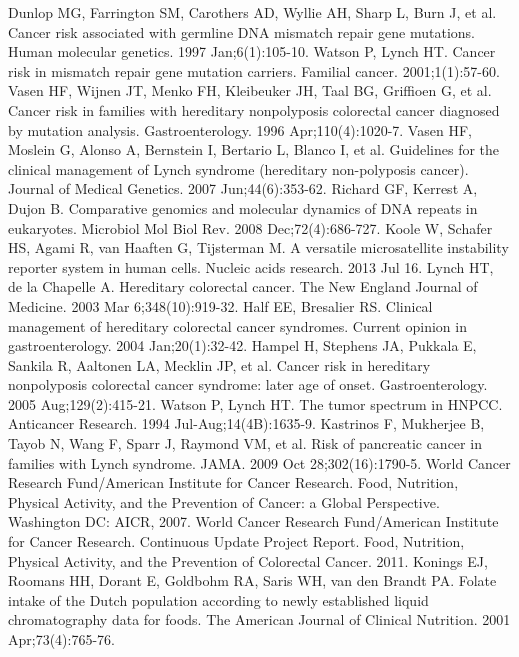 \begin{thebibliography}{12}
		Dunlop MG, Farrington SM, Carothers AD, Wyllie AH, Sharp L, Burn J, et al. Cancer risk associated with germline DNA mismatch repair gene mutations. Human molecular genetics. 1997 Jan;6(1):105-10. 
		Watson P, Lynch HT. Cancer risk in mismatch repair gene mutation carriers. Familial cancer. 2001;1(1):57-60. 
		Vasen HF, Wijnen JT, Menko FH, Kleibeuker JH, Taal BG, Griffioen G, et al. Cancer risk in families with hereditary nonpolyposis colorectal cancer diagnosed by mutation analysis. Gastroenterology. 1996 Apr;110(4):1020-7. 
		Vasen HF, Moslein G, Alonso A, Bernstein I, Bertario L, Blanco I, et al. Guidelines for the clinical management of Lynch syndrome (hereditary non-polyposis cancer). Journal of Medical Genetics. 2007 Jun;44(6):353-62. 
		Richard GF, Kerrest A, Dujon B. Comparative genomics and molecular dynamics of DNA repeats in eukaryotes. Microbiol Mol Biol Rev. 2008 Dec;72(4):686-727. 
		Koole W, Schafer HS, Agami R, van Haaften G, Tijsterman M. A versatile microsatellite instability reporter system in human cells. Nucleic acids research. 2013 Jul 16. 
		Lynch HT, de la Chapelle A. Hereditary colorectal cancer. The New England Journal of Medicine. 2003 Mar 6;348(10):919-32. 
		Half EE, Bresalier RS. Clinical management of hereditary colorectal cancer syndromes. Current opinion in gastroenterology. 2004 Jan;20(1):32-42. 
		Hampel H, Stephens JA, Pukkala E, Sankila R, Aaltonen LA, Mecklin JP, et al. Cancer risk in hereditary nonpolyposis colorectal cancer syndrome: later age of onset. Gastroenterology. 2005 Aug;129(2):415-21. 
		Watson P, Lynch HT. The tumor spectrum in HNPCC. Anticancer Research. 1994 Jul-Aug;14(4B):1635-9. 
		Kastrinos F, Mukherjee B, Tayob N, Wang F, Sparr J, Raymond VM, et al. Risk of pancreatic cancer in families with Lynch syndrome. JAMA. 2009 Oct 28;302(16):1790-5. 
		World Cancer Research Fund/American Institute for Cancer Research. Food, Nutrition, Physical Activity, and the Prevention of Cancer: a Global Perspective. Washington DC: AICR, 2007. 
		World Cancer Research Fund/American Institute for Cancer Research. Continuous Update Project Report. Food, Nutrition, Physical Activity, and the Prevention of Colorectal Cancer. 2011. 
		Konings EJ, Roomans HH, Dorant E, Goldbohm RA, Saris WH, van den Brandt PA. Folate intake of the Dutch population according to newly established liquid chromatography data for foods. The American Journal of Clinical Nutrition. 2001 Apr;73(4):765-76. 

\end{thebibliography}
